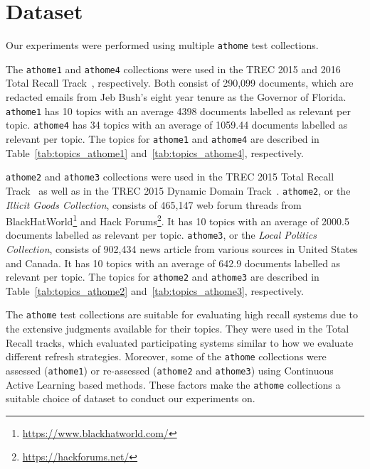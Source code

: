 \label{chap:dataset}

\section{Dataset}
Our experiments were performed using multiple \texttt{athome} test collections.

The \texttt{athome1} and \texttt{athome4} collections were used in the TREC 2015 and 2016 Total Recall
Track~\cite{roegiest2015trec,grossman2016trec}, respectively. Both consist of
290,099 documents, which are redacted emails from Jeb Bush's eight year tenure
as the Governor of Florida. \texttt{athome1} has 10 topics with an average 4398
documents labelled as relevant per topic. \texttt{athome4} has 34 topics with an
average of 1059.44 documents labelled as relevant per topic. The topics for
\texttt{athome1} and \texttt{athome4} are described in
Table~\ref{tab:topics_athome1} and~\ref{tab:topics_athome4}, respectively.

\texttt{athome2} and \texttt{athome3} collections were used in the TREC 2015
Total Recall Track~\cite{roegiest2015trec} as well as in the TREC 2015 Dynamic
Domain Track~\cite{yang2015overview}. \texttt{athome2}, or the \textit{Illicit
Goods Collection}, consists of 465,147 web forum threads from
BlackHatWorld\footnote{\url{https://www.blackhatworld.com/}} and
Hack Forums\footnote{\url{https://hackforums.net/}}. It has 10 topics with an
average of 2000.5 documents labelled as relevant per topic. \texttt{athome3}, or
the \textit{Local Politics Collection}, consists of 902,434 news article from
various sources in United States and Canada. It has 10 topics with an
average of 642.9 documents labelled as relevant per topic. The topics for
\texttt{athome2} and \texttt{athome3} are described in
Table~\ref{tab:topics_athome2} and~\ref{tab:topics_athome3}, respectively.

The \texttt{athome} test collections are suitable for evaluating high recall
systems due to the extensive judgments available for their topics. They were
used in the Total Recall tracks, which evaluated participating systems similar
to how we evaluate different refresh strategies. Moreover, some of the
\texttt{athome} collections were assessed (\texttt{athome1}) or re-assessed
(\texttt{athome2} and \texttt{athome3}) using Continuous Active Learning based
methods. These factors make the \texttt{athome} collections a suitable choice of
dataset to conduct our experiments on.


